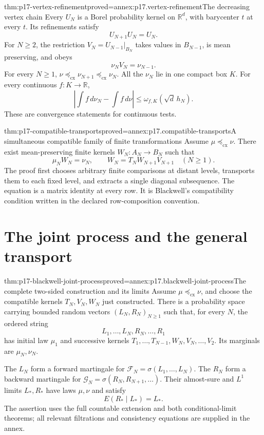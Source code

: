 \begin{hbtheorem}{thm:p17-vertex-refinement}{proved=annex:p17.vertex-refinement}{The decreasing vertex chain}
Every \(U_N\) is a Borel probability kernel on \(\mathbb R^d\), with
barycenter \(t\) at every \(t\). Its refinements satisfy
\[
                      U_{N+1}U_N=U_N.
\]
For \(N\geq2\), the restriction \(V_N=U_{N-1}|_{B_N}\) takes values
in \(B_{N-1}\), is mean preserving, and obeys
\[
                \nu_NV_N=\nu_{N-1}.
\]
For every \(N\geq1\),
\(\nu\preceq_{\mathrm{cx}}\nu_{N+1}\preceq_{\mathrm{cx}}\nu_N\).
All the \(\nu_N\) lie in one compact box \(K\). For every continuous
\(f:K\to\mathbb R\),
\[
        \left|\int f\,d\nu_N-\int f\,d\nu\right|
                            \leq\omega_{f,K}(\sqrt d\,h_N).
\]
These are convergence statements for continuous tests.
\end{hbtheorem}

\begin{hbtheorem}{thm:p17-compatible-transports}{proved=annex:p17.compatible-transports}{A simultaneous compatible family of finite transformations}
Assume \(\mu\preceq_{\mathrm{cx}}\nu\). There exist mean-preserving
finite kernels \(W_N:A_N\to B_N\) such that
\[
                 \mu_NW_N=\nu_N,\qquad
                 W_N=T_NW_{N+1}V_{N+1}\quad(N\geq1).
\]
The proof first chooses arbitrary finite comparisons at distant levels,
transports them to each fixed level, and extracts a single diagonal
subsequence. The equation is a matrix identity at every row.
It is Blackwell's compatibility condition written in the declared
row-composition convention.
\end{hbtheorem}

\section{The joint process and the general transport}
\label{sec:p17-blackwell-joint-process}

\begin{hbtheorem}{thm:p17-blackwell-joint-process}{proved=annex:p17.blackwell-joint-process}{The complete two-sided construction and its limits}
Assume \(\mu\preceq_{\mathrm{cx}}\nu\), and choose the compatible
kernels \(T_N,V_N,W_N\) just constructed.
There is a probability space carrying bounded random vectors
\((L_N,R_N)_{N\geq1}\) such that, for every \(N\), the ordered string
\[
                    L_1,\ldots,L_N,R_N,\ldots,R_1
\]
has initial law \(\mu_1\) and successive kernels
\(T_1,\ldots,T_{N-1},W_N,V_N,\ldots,V_2\).
Its marginals are \(\mu_N,\nu_N\).

The \(L_N\) form a forward martingale for
\(\mathcal F_N=\sigma(L_1,\ldots,L_N)\).
The \(R_N\) form a backward martingale for
\(\mathcal G_N=\sigma(R_N,R_{N+1},\ldots)\).
Their almost-sure and \(L^1\) limits \(L_*,R_*\) have laws \(\mu,\nu\)
and satisfy
\[
                          E(R_*\mid L_*)=L_*.
\]
The assertion uses the full countable extension and both conditional-limit
theorems; all relevant filtrations and consistency equations are supplied
in the annex.
\end{hbtheorem}

